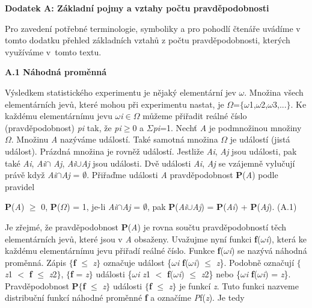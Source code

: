 \noindent \textbf{Dodatek A:  Základní pojmy a vztahy počtu pravděpodobnosti}

\noindent Pro zavedení potřebné terminologie, symboliky a pro pohodlí čtenáře uvádíme v tomto dodatku přehled základních vztahů z počtu pravděpodobnosti, kterých využíváme v~tomto textu.

\noindent \textbf{A.1  Náhodná proměnná}

\noindent Výsledkem statistického experimentu je nějaký elementární jev $\omega$. Množina všech elementárních jevů, které mohou při experimentu nastat, je $\Omega$=$\{$$\omega$1,$\omega$2,$\omega$3,...$\}$. Ke každému elementárnímu jevu $\omega$\textit{i}$\in$$\Omega$ můžeme přiřadit reálné číslo (pravděpodobnost) \textit{pi} tak, že \textit{pi}$\geq$0  a  $\Sigma$\textit{pi}=1. Nechť \textit{A} je podmnožinou množiny $\Omega$. Množinu \textit{A} nazýváme událostí. Také samotná množina $\Omega$ je událostí (jistá událost). Prázdná množina je rovněž událostí. Jestliže \textit{Ai}, \textit{Aj} jsou události, pak také \textit{Ai}, \textit{Ai}$\cap$ \textit{Aj}, \textit{Ai}$\cup$\textit{Aj} jsou události. Dvě události \textit{Ai}, \textit{Aj} se vzájemně vylučují právě když \textit{Ai}$\cap$\textit{Aj} = $\emptyset$. Přiřaďme události \textit{A} pravděpodobnost \textbf{P}(\textit{A}) podle pravidel

  \textbf{P}(\textit{A}) $\geq$ 0,     \textbf{P}($\Omega$) = 1,     je-li \textit{Ai}$\cap$\textit{Aj} = $\emptyset$,  pak \textbf{P}(\textit{Ai}$\cup$\textit{Aj}) = \textbf{P}(\textit{Ai}) + \textbf{P}(\textit{Aj}). (A.1)

\noindent Je zřejmé, že pravděpodobnost \textbf{P}(\textit{A}) je rovna součtu pravděpodobností těch elementárních jevů, které jsou v \textit{A} obsaženy. Uvažujme nyní funkci \textbf{f}($\omega$\textit{i}), která ke každému elementárnímu jevu přiřadí reálné číslo. Funkce \textbf{f}($\omega$\textit{i}) se nazývá náhodná proměnná. Zápis $\{$\textbf{f} $\leq$ \textit{z}$\}$ označuje událost \{$\omega$\textit{i} \textbar  \textbf{f}($\omega$\textit{i}) $\leq$ \textit{z}\}. Podobně označují $\{$\textit{z}1 $<$ \textbf{f} $\leq$ \textit{z}2$\}$, $\{$\textbf{f} = \textit{z}$\}$ události \{$\omega$\textit{i} \textbar  \textit{z}1 $<$ \textbf{f}($\omega$\textit{i}) $\leq$ \textit{z}2\} nebo \{$\omega$\textit{i} \textbar  \textbf{f}($\omega$\textit{i}) = \textit{z}\}. Pravděpodobnost \textbf{P}$\{$\textbf{f} $\leq$ \textit{z}$\}$ události $\{$\textbf{f} $\leq$ \textit{z}$\}$ je funkcí \textit{z}. Tuto funkci nazveme distribuční funkcí náhodné proměnné \textbf{f} a označíme \textit{P}f(\textit{z}). Je tedy

